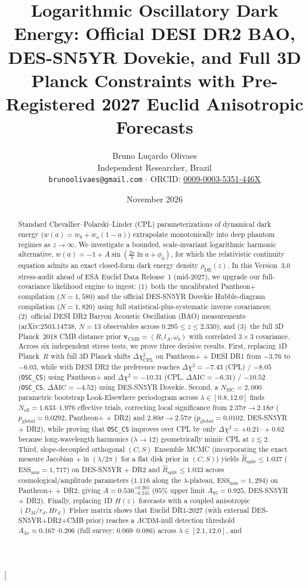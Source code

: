\documentclass[10pt,twocolumn,a4paper]{article}
\title{\textbf{Logarithmic Oscillatory Dark Energy: Official DESI DR2 BAO, DES-SN5YR Dovekie, and Full 3D Planck Constraints with Pre-Registered 2027 Euclid Anisotropic Forecasts}}
\author{Bruno Lu\c{c}ardo Olivaes \\ \small Independent Researcher, Brazil \\ \small \texttt{brunoolivaes@gmail.com} $\cdot$ ORCID: \href{https://orcid.org/0009-0003-5351-446X}{0009-0003-5351-446X}}
\date{November 2026}
\begin{document}
\twocolumn[{%
  \begin{@twocolumnfalse}
    \maketitle
    \begin{abstract}
    \noindent Standard Chevallier--Polarski--Linder (CPL) parameterizations of dynamical dark energy ($w(a) = w_0 + w_a(1-a)$) extrapolate monotonically into deep phantom regimes as $z \to \infty$. We investigate a bounded, scale-invariant logarithmic harmonic alternative, $w(a) = -1 + A\sin\!\left(\frac{2\pi}{\lambda}\ln a + \phi_0\right)$, for which the relativistic continuity equation admits an exact closed-form dark energy density $\rho_{\mathrm{DE}}(z)$. In this Version~3.0 stress-audit ahead of ESA Euclid Data Release~1 (mid-2027), we upgrade our full-covariance likelihood engine to ingest: (1)~both the uncalibrated Pantheon+ compilation ($N = 1,580$) and the official DES-SN5YR Dovekie Hubble-diagram compilation ($N = 1,820$) using full statistical-plus-systematic inverse covariances; (2)~official DESI DR2 Baryon Acoustic Oscillation (BAO) measurements (arXiv:2503.14738, $N = 13$ observables across $0.295 \le z \le 2.330$); and (3)~the full 3D Planck~2018 CMB distance prior $\mathbf{v}_{\mathrm{CMB}} = (R, l_A, \omega_b)$ with correlated $3\times 3$ covariance. Across six independent stress tests, we prove three decisive results. First, replacing 1D Planck~$R$ with full 3D Planck shifts $\Delta\chi^2_{\mathrm{CPL}}$ on Pantheon+ + DESI DR1 from $-3.76$ to $-6.03$, while with DESI DR2 the preference reaches $\Delta\chi^2 = -7.43$ (CPL) / $-8.05$ (\texttt{OSC\_CS}) using Pantheon+ and $\Delta\chi^2 = -10.31$ (CPL, $\Delta\mathrm{AIC}=-6.31$) / $-10.52$ (\texttt{OSC\_CS}, $\Delta\mathrm{AIC}=-4.52$) using DES-SN5YR Dovekie. Second, a $N_{\mathrm{MC}} = 2,000$ parametric bootstrap Look-Elsewhere periodogram across $\lambda \in [0.8, 12.0]$ finds $N_{\mathrm{eff}} = 1.633\text{--}1.976$ effective trials, correcting local significance from $2.37\sigma \to 2.18\sigma$ ($p_{\mathrm{global}} = 0.0292$, Pantheon+ + DR2) and $2.80\sigma \to 2.57\sigma$ ($p_{\mathrm{global}} = 0.0102$, DES-SN5YR + DR2), while proving that \texttt{OSC\_CS} improves over CPL by only $\Delta\chi^2 = +0.21\text{--}+0.62$ because long-wavelength harmonics ($\lambda \to 12$) geometrically mimic CPL at $z \lesssim 2$. Third, slope-decoupled orthogonal $(C, S)$ Ensemble MCMC (incorporating the exact measure Jacobian $+\ln(\lambda/2\pi)$ for a flat disk prior in $(C,S)$) yields $\hat{R}_{\mathrm{split}} \le 1.037$ ($\mathrm{ESS}_{\min} = 1,717$) on DES-SN5YR + DR2 and $\hat{R}_{\mathrm{split}} \le 1.033$ across cosmological/amplitude parameters ($1.116$ along the $\lambda$-plateau, $\mathrm{ESS}_{\min} = 1,294$) on Pantheon+ + DR2, giving $A = 0.536^{+0.265}_{-0.245}$ ($95\%$ upper limit $A_{95} = 0.925$, DES-SN5YR + DR2). Finally, replacing 1D $H(z)$ forecasts with a coupled anisotropic $(D_M/r_d, H r_d)$ Fisher matrix shows that Euclid DR1-2027 (with external DES-SN5YR+DR2+CMB prior) reaches a $\Lambda\mathrm{CDM}$-null detection threshold $A_{3\sigma} \approx 0.167\text{--}0.206$ (full survey: $0.069\text{--}0.086$) across $\lambda \in [2.1, 12.0]$, and 
\end{abstract}
\end{@twocolumnfalse}}
\end{document}
